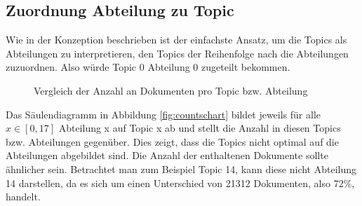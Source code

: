 \documentclass[german,version-2020-11]{uzl-thesis}
\begin{document}
\subsection{Zuordnung Abteilung zu Topic}
Wie in der Konzeption beschrieben ist der einfachste Ansatz, um die Topics als Abteilungen zu interpretieren, den Topics der Reihenfolge nach die Abteilungen zuzuordnen. Also würde Topic 0 Abteilung 0 zugeteilt bekommen. \\
\begin{figure}[H]
\begin{center}
\caption{Vergleich der Anzahl an Dokumenten pro Topic bzw. Abteilung}
\label{fig:countchart}
\end{center}
\end{figure}

Das Säulendiagramm in Abbildung \ref{fig:countschart} bildet jeweils für alle $x \in [0,17]$ Abteilung x auf Topic x ab und stellt die Anzahl in diesen Topics bzw. Abteilungen gegenüber. Dies zeigt, dass die Topics nicht optimal auf die Abteilungen abgebildet sind. Die Anzahl der enthaltenen Dokumente sollte ähnlicher sein. Betrachtet man zum Beispiel Topic 14, kann diese nicht Abteilung 14 darstellen, da es sich um einen Unterschied von 21312 Dokumenten, also 72$\%$, handelt.\\
\end{document}
